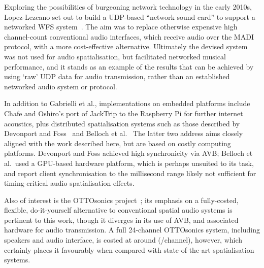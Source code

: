 Exploring the possibilities of burgeoning network technology in the early 2010s,
Lopez-Lezcano set out to build a UDP-based ``network sound card'' to support
a networked WFS system~\citep{lopez-lezcano_jack_2012}.
The aim was to replace otherwise expensive high channel-count conventional
audio interfaces, which receive audio over the MADI protocol, with a more
cost-effective alternative.
Ultimately the devised system was not used for audio spatialisation, but
facilitated networked musical performance, and it stands as an example of the
results that can be achieved by using `raw' UDP data for audio transmission,
rather than an established networked audio system or protocol.

In addition to Gabrielli et al., implementations on embedded platforms include
Chafe and Oshiro's port of JackTrip to the Raspberry Pi for further internet
acoustics, plus distributed spatialisation systems such as those described by
Devonport and Foss~\citep{devonport_distribution_2019} and Belloch et
al.~\citep{belloch_performance_2021}
The latter two address aims closely aligned with the work described here, but
are based on costly computing platforms.
Devonport and Foss achieved high synchronicity via AVB; Belloch et al.\ used a
GPU-based hardware platform, which is perhaps unsuited to its task, and report
client synchronisation to the millisecond range \textemdash{} likely not
sufficient for timing-critical audio spatialisation effects.

Also of interest is the OTTOsonics project~\citep{mitterhuber_ottosonics_2022};
its emphasis on a fully-costed, flexible, do-it-yourself alternative to
conventional spatial audio systems is pertinent to this work, though it diverges
in its use of AVB, and associated hardware for audio transmission.
A full 24-channel OTTOsonics system, including speakers and audio interface, is
costed at around  (/channel), however, which
certainly places it favourably when compared with state-of-the-art
spatialisation systems.
